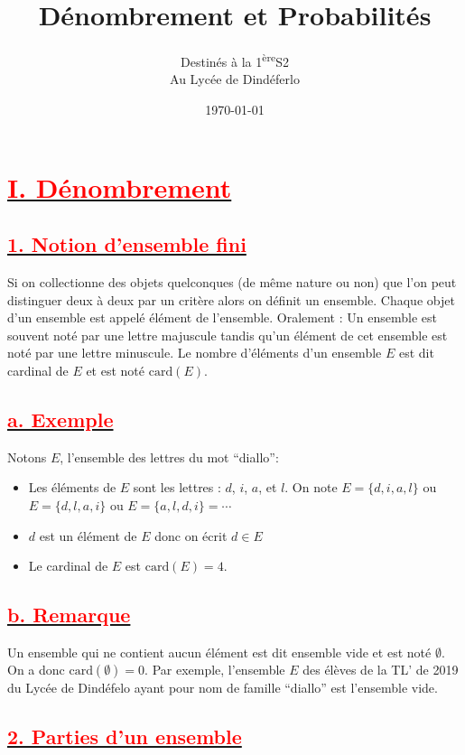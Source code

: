 \documentclass[12pt]{article}
\author{Destinés à la 1\textsuperscript{ère}S2\\Au Lycée de Dindéferlo}
\title{\textbf{Dénombrement et Probabilités}}
\date{\today}
\begin{document}
\maketitle
\newpage
\section*{\underline{\textbf{\textcolor{red}{I. Dénombrement}}}}
\subsection*{\underline{\textbf{\textcolor{red}{1. Notion d’ensemble fini}}}}
Si on collectionne des objets quelconques (de même nature ou non) que l’on peut distinguer deux à deux 
par un critère alors on définit un ensemble. Chaque objet d’un ensemble est appelé élément de l’ensemble. 
Oralement : Un ensemble est souvent noté par une lettre majuscule tandis qu’un élément de cet 
ensemble est noté par une lettre minuscule. Le nombre d’éléments d’un ensemble \(E\) est dit cardinal 
de \(E\) et est noté \(\text{card} (E)\).
\subsection*{\underline{\textbf{\textcolor{red}{a. Exemple}}}}
Notons \(E\), l’ensemble des lettres du mot ``diallo'':
\begin{itemize}
    \item Les éléments de \(E\) sont les lettres : \(d\), \(i\), \(a\), et \(l\). On note \(E = \{d, i, a, l\}\) ou 
    \(E = \{d, l, a, i\}\) ou \(E = \{a, l, d, i\} = \cdots\)
    \item \(d\) est un élément de \(E\) donc on écrit \(d \in E\) %
    \item Le cardinal de \(E\) est \(\text{card}(E) = 4\).
\end{itemize}
\subsection*{\underline{\textbf{\textcolor{red}{b. Remarque}}}}
Un ensemble qui ne contient aucun élément est dit ensemble vide et est noté \(\emptyset\). On a donc 
\(\text{card}(\emptyset) = 0\). Par exemple, l’ensemble \(E\) des élèves de la TL’ de 2019 du Lycée de 
Dindéfelo ayant pour nom de famille ``diallo'' est l’ensemble vide.
\subsection*{\underline{\textbf{\textcolor{red}{2. Parties d’un ensemble}}}}
\end{document}
